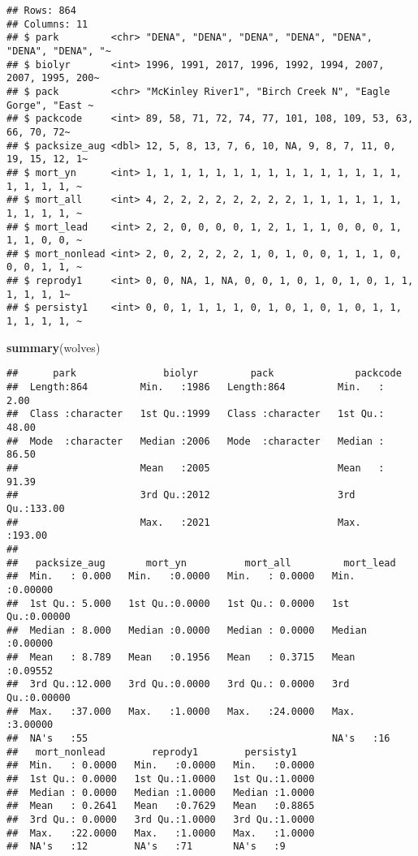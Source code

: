 \documentclass[
]{article}
\newenvironment{Shaded}{\begin{snugshade}}{\end{snugshade}}
\newcommand{\FunctionTok}[1]{\textcolor[rgb]{0.13,0.29,0.53}{\textbf{#1}}}
\newcommand{\NormalTok}[1]{#1}
\begin{document}
\begin{verbatim}
## Rows: 864
## Columns: 11
## $ park         <chr> "DENA", "DENA", "DENA", "DENA", "DENA", "DENA", "DENA", "~
## $ biolyr       <int> 1996, 1991, 2017, 1996, 1992, 1994, 2007, 2007, 1995, 200~
## $ pack         <chr> "McKinley River1", "Birch Creek N", "Eagle Gorge", "East ~
## $ packcode     <int> 89, 58, 71, 72, 74, 77, 101, 108, 109, 53, 63, 66, 70, 72~
## $ packsize_aug <dbl> 12, 5, 8, 13, 7, 6, 10, NA, 9, 8, 7, 11, 0, 19, 15, 12, 1~
## $ mort_yn      <int> 1, 1, 1, 1, 1, 1, 1, 1, 1, 1, 1, 1, 1, 1, 1, 1, 1, 1, 1, ~
## $ mort_all     <int> 4, 2, 2, 2, 2, 2, 2, 2, 2, 1, 1, 1, 1, 1, 1, 1, 1, 1, 1, ~
## $ mort_lead    <int> 2, 2, 0, 0, 0, 0, 1, 2, 1, 1, 1, 0, 0, 0, 1, 1, 1, 0, 0, ~
## $ mort_nonlead <int> 2, 0, 2, 2, 2, 2, 1, 0, 1, 0, 0, 1, 1, 1, 0, 0, 0, 1, 1, ~
## $ reprody1     <int> 0, 0, NA, 1, NA, 0, 0, 1, 0, 1, 0, 1, 0, 1, 1, 1, 1, 1, 1~
## $ persisty1    <int> 0, 0, 1, 1, 1, 1, 0, 1, 0, 1, 0, 1, 0, 1, 1, 1, 1, 1, 1, ~
\end{verbatim}

\begin{Shaded}
\begin{Highlighting}[]
\FunctionTok{summary}\NormalTok{(wolves)}
\end{Highlighting}
\end{Shaded}

\begin{verbatim}
##      park               biolyr         pack              packcode     
##  Length:864         Min.   :1986   Length:864         Min.   :  2.00  
##  Class :character   1st Qu.:1999   Class :character   1st Qu.: 48.00  
##  Mode  :character   Median :2006   Mode  :character   Median : 86.50  
##                     Mean   :2005                      Mean   : 91.39  
##                     3rd Qu.:2012                      3rd Qu.:133.00  
##                     Max.   :2021                      Max.   :193.00  
##                                                                       
##   packsize_aug       mort_yn          mort_all         mort_lead      
##  Min.   : 0.000   Min.   :0.0000   Min.   : 0.0000   Min.   :0.00000  
##  1st Qu.: 5.000   1st Qu.:0.0000   1st Qu.: 0.0000   1st Qu.:0.00000  
##  Median : 8.000   Median :0.0000   Median : 0.0000   Median :0.00000  
##  Mean   : 8.789   Mean   :0.1956   Mean   : 0.3715   Mean   :0.09552  
##  3rd Qu.:12.000   3rd Qu.:0.0000   3rd Qu.: 0.0000   3rd Qu.:0.00000  
##  Max.   :37.000   Max.   :1.0000   Max.   :24.0000   Max.   :3.00000  
##  NA's   :55                                          NA's   :16       
##   mort_nonlead        reprody1        persisty1     
##  Min.   : 0.0000   Min.   :0.0000   Min.   :0.0000  
##  1st Qu.: 0.0000   1st Qu.:1.0000   1st Qu.:1.0000  
##  Median : 0.0000   Median :1.0000   Median :1.0000  
##  Mean   : 0.2641   Mean   :0.7629   Mean   :0.8865  
##  3rd Qu.: 0.0000   3rd Qu.:1.0000   3rd Qu.:1.0000  
##  Max.   :22.0000   Max.   :1.0000   Max.   :1.0000  
##  NA's   :12        NA's   :71       NA's   :9
\end{verbatim}
\end{document}
